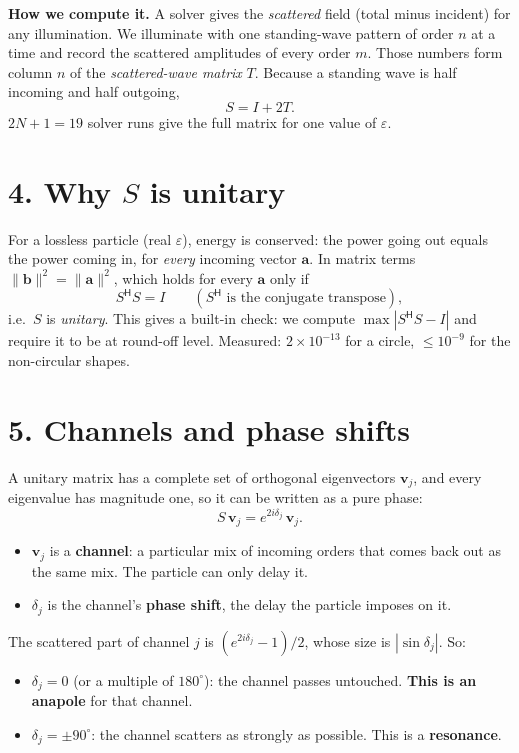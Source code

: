 \documentclass[10pt,a4paper]{article}
\begin{document}
\textbf{How we compute it.} A solver gives the \emph{scattered} field (total minus incident)
for any illumination. We illuminate with one standing-wave pattern of order $n$ at a time and
record the scattered amplitudes of every order $m$. Those numbers form column $n$ of the
\emph{scattered-wave matrix} $T$. Because a standing wave is half incoming and half outgoing,
\[
S = I + 2T .
\]
$2N+1 = 19$ solver runs give the full matrix for one value of $\varepsilon$.

\section*{4. Why $S$ is unitary}
For a lossless particle (real $\varepsilon$), energy is conserved: the power going out equals
the power coming in, for \emph{every} incoming vector $\mathbf a$. In matrix terms
$\|\mathbf b\|^2 = \|\mathbf a\|^2$, which holds for every $\mathbf a$ only if
\[
S^{\mathsf H} S = I \qquad (S^{\mathsf H}\text{ is the conjugate transpose}),
\]
i.e.\ $S$ is \emph{unitary}. This gives a built-in check: we compute $\max|S^{\mathsf H}S - I|$
and require it to be at round-off level. Measured: $2\times10^{-13}$ for a circle,
$\le 10^{-9}$ for the non-circular shapes.

\section*{5. Channels and phase shifts}
A unitary matrix has a complete set of orthogonal eigenvectors $\mathbf v_j$, and every eigenvalue
has magnitude one, so it can be written as a pure phase:
\[
S\,\mathbf v_j = e^{2i\delta_j}\,\mathbf v_j .
\]
\begin{itemize}
\item $\mathbf v_j$ is a \textbf{channel}: a particular mix of incoming orders that comes back out
as the same mix. The particle can only delay it.
\item $\delta_j$ is the channel's \textbf{phase shift}, the delay the particle imposes on it.
\end{itemize}
The scattered part of channel $j$ is $(e^{2i\delta_j}-1)/2$, whose size is $|\sin\delta_j|$. So:
\begin{itemize}
\item $\delta_j = 0$ (or a multiple of $180^\circ$): the channel passes untouched. \textbf{This is an anapole}
for that channel.
\item $\delta_j = \pm 90^\circ$: the channel scatters as strongly as possible. This is a \textbf{resonance}.
\end{itemize}
\end{document}
